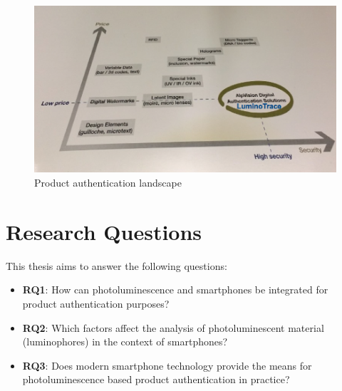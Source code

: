 \documentclass[thesis.tex]{subfiles}
\begin{document}

\begin{figure}[h!]
\centering \includegraphics[width=\linewidth]{images/landscape}
\caption{Product authentication landscape \label{fig:landscape}}
\end{figure}

\section{Research Questions}
\label{chapter:research-questions}

This thesis aims to answer the following questions:

\begin{itemize}
  \item \label{RQ1} \textbf{RQ1}: How can photoluminescence and smartphones be integrated for product authentication purposes?
  \item \label{RQ2} \textbf{RQ2}: Which factors affect the analysis of photoluminescent material (luminophores) in the context of smartphones?
  \item \label{RQ3} \textbf{RQ3}: Does modern smartphone technology provide the means for photoluminescence based product authentication in practice?
\end{itemize}
\end{document}
